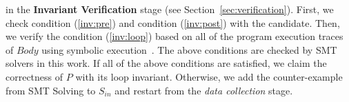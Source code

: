 \begin{itemize}
    in the \textbf{Invariant Verification} stage (see Section~\ref{sec:verification}). 
    First, we check condition (\ref{inv:pre}) and condition (\ref{inv:post}) with the candidate. 
    Then, we verify the condition (\ref{inv:loop}) 
    based on all of the program execution traces of $\mathit{Body}$ using symbolic execution~\cite{}. 
    The above conditions are checked by SMT~\cite{barrett2009satisfiability} solvers in this work. 
    If all of the above conditions are satisfied, 
    we claim the correctness of $P$ with its loop invariant. 
    Otherwise, we add the counter-example from SMT Solving to $S_{\mathit{in}}$ 
    and restart from the \emph{data collection} stage. 
\end{itemize}


%


